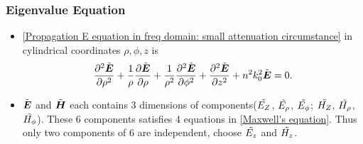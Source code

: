 \documentclass[12pt]{extarticle}
\numberwithin{equation}{section}
\numberwithin{figure}{section}
\numberwithin{table}{section}
\newcommand{\<}{\langle}
\renewcommand{\>}{\rangle}
\theoremstyle{definition}
\begin{document}
        \subsubsection{Eigenvalue Equation}
            \begin{itemize}
                \item \autoref{Propagation E equation in freq domain: small attenuation circumstance} in cylindrical coordinates $\rho,\phi,z$ is
                    \begin{equation}
                        \pdv[2]{\Tilde{\boldsymbol{E}}}{\rho}+\frac{1}{\rho}\pdv{\Tilde{\boldsymbol{E}}}{\rho}+\frac{1}{\rho^2}\pdv[2]{\Tilde{\boldsymbol{E}}}{\phi}+\pdv[2]{\Tilde{\boldsymbol{E}}}{z}+n^2k_0^2\Tilde{\boldsymbol{E}}=0.
                    \end{equation}
                \item $\Tilde{\boldsymbol{E}}$ and $\Tilde{\boldsymbol{H}}$ each contains 3 dimensions of components($\Tilde{E_Z}$, $\Tilde{E_\rho}$, $\Tilde{E_\phi}$; $\Tilde{H_Z}$, $\Tilde{H_\rho}$, $\Tilde{H_\phi}$). These 6 components satisfies 4 equations in \autoref{Maxwell's equation}. Thus only two components of 6 are independent, choose $\Tilde{E_z}$ and $\Tilde{H_z}$. 
                

\end{itemize}
\end{document}
